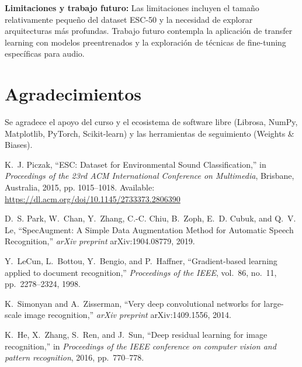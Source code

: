 \documentclass[conference]{IEEEtran}
\begin{document}
\textbf{Limitaciones y trabajo futuro:} Las limitaciones incluyen el tamaño relativamente pequeño del dataset ESC-50 y la necesidad de explorar arquitecturas más profundas. Trabajo futuro contempla la aplicación de transfer learning con modelos preentrenados y la exploración de técnicas de fine-tuning específicas para audio.

\section*{Agradecimientos}
Se agradece el apoyo del curso y el ecosistema de software libre (Librosa, NumPy, Matplotlib, PyTorch, Scikit-learn) y las herramientas de seguimiento (Weights \& Biases).

\begin{thebibliography}{00}

K.~J. Piczak, ``ESC: Dataset for Environmental Sound Classification,''
in \emph{Proceedings of the 23rd ACM International Conference on Multimedia},
Brisbane, Australia, 2015, pp. 1015--1018. Available: \url{https://dl.acm.org/doi/10.1145/2733373.2806390}

D.~S. Park, W.~Chan, Y.~Zhang, C.-C. Chiu, B.~Zoph, E.~D. Cubuk, and Q.~V. Le,
``SpecAugment: A Simple Data Augmentation Method for Automatic Speech Recognition,''
\emph{arXiv preprint} arXiv:1904.08779, 2019.

Y.~LeCun, L.~Bottou, Y.~Bengio, and P.~Haffner,
``Gradient-based learning applied to document recognition,''
\emph{Proceedings of the IEEE}, vol.~86, no.~11, pp.~2278--2324, 1998.

K.~Simonyan and A.~Zisserman,
``Very deep convolutional networks for large-scale image recognition,''
\emph{arXiv preprint} arXiv:1409.1556, 2014.

K.~He, X.~Zhang, S.~Ren, and J.~Sun,
``Deep residual learning for image recognition,''
in \emph{Proceedings of the IEEE conference on computer vision and pattern recognition}, 2016, pp.~770--778.

\end{thebibliography}
\end{document}

